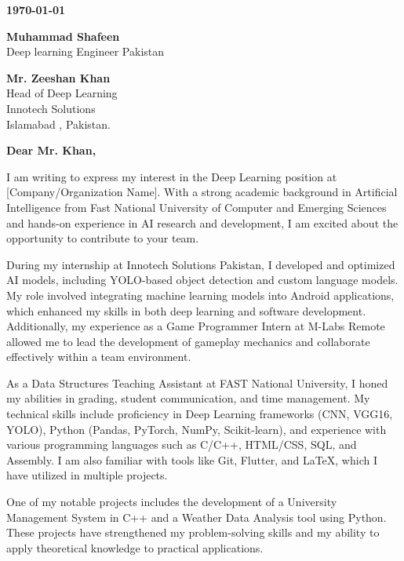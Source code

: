 \documentclass{letter}
\begin{document}
\begin{flushleft}
\textbf{\today}
\end{flushleft}

\vspace{1em}

\textbf{Muhammad Shafeen} \\
Deep learning Engineer
Pakistan \\

\vspace{2em}

\textbf{Mr. Zeeshan Khan} \\
Head of Deep Learning \\
Innotech Solutions\\
Islamabad , Pakistan.

\vspace{2em}

\textbf{Dear Mr. Khan,}

\vspace{1em}

\noindent
I am writing to express my interest in the Deep Learning position at [Company/Organization Name]. With a strong academic background in Artificial Intelligence from Fast National University of Computer and Emerging Sciences and hands-on experience in AI research and development, I am excited about the opportunity to contribute to your team.

During my internship at Innotech Solutions Pakistan, I developed and optimized AI models, including YOLO-based object detection and custom language models. My role involved integrating machine learning models into Android applications, which enhanced my skills in both deep learning and software development. Additionally, my experience as a Game Programmer Intern at M-Labs Remote allowed me to lead the development of gameplay mechanics and collaborate effectively within a team environment.

As a Data Structures Teaching Assistant at FAST National University, I honed my abilities in grading, student communication, and time management. My technical skills include proficiency in Deep Learning frameworks (CNN, VGG16, YOLO), Python (Pandas, PyTorch, NumPy, Scikit-learn), and experience with various programming languages such as C/C++, HTML/CSS, SQL, and Assembly. I am also familiar with tools like Git, Flutter, and LaTeX, which I have utilized in multiple projects.

One of my notable projects includes the development of a University Management System in C++ and a Weather Data Analysis tool using Python. These projects have strengthened my problem-solving skills and my ability to apply theoretical knowledge to practical applications.
\end{document}
